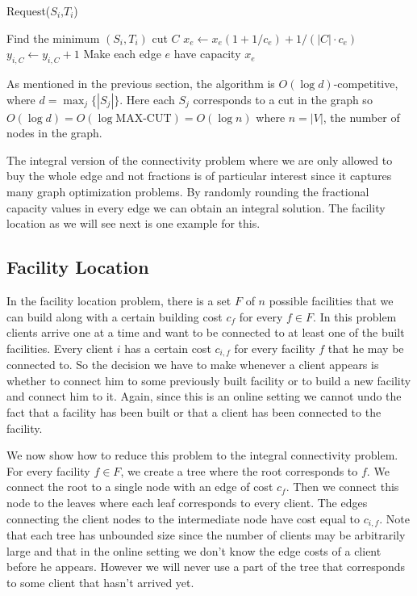 \begin{algorithm}
\caption{Request($S_i$,$T_i$)}
\begin{algorithmic}[1]
  \STATE Find the minimum  $(S_i,T_i)$ cut $C$
    \STATE $x_e \leftarrow x_e (1 + 1/c_e) + 1/(|C| \cdot c_e)$ 
  \ENDFOR
  \STATE $y_{i,C} \leftarrow y_{i,C} + 1$
\ENDWHILE
\STATE Make each edge $e$ have capacity $x_e$
\end{algorithmic}
\end{algorithm}

As mentioned in the previous section, the algorithm is $O(\log d)$-competitive, where $d = \max_j\{|S_j|\}$. Here each $S_j$ corresponds to a cut in the graph so $O( \log d ) = O( \log \textrm{MAX-CUT} ) = O( \log n )$ where $n = |V|$, the number of nodes in the graph.

The integral version of the connectivity problem where we are only allowed to buy the whole edge and not fractions is of particular interest since it captures many graph optimization problems. By randomly rounding the fractional capacity values in every edge we can obtain an integral solution. The facility location as we will see next is one example for this.

\subsection{Facility Location}
In the facility location problem, there is a set $F$ of $n$ possible facilities that we can build along with a certain building cost $c_f$ for every $f \in F$. In this problem clients arrive one at a time and want to be connected to at least one of the built facilities. Every client $i$ has a certain cost $c_{i,f}$ for every facility $f$ that he may be connected to. So the decision we have to make whenever a client appears is whether to connect him to some previously built facility or to build a new facility and connect him to it. Again, since this is an online setting we cannot undo the fact that a facility has been built or that a client has been connected to the facility.

We now show how to reduce this problem to the integral connectivity problem. For every facility $f \in F$, we create a tree where the root corresponds to $f$. We connect the root to a single node with an edge of cost $c_f$. Then we connect this node to the leaves where each leaf corresponds to every client. The edges connecting the client nodes to the intermediate node have cost equal to $c_{i,f}$. Note that each tree has unbounded size since the number of clients may be arbitrarily large and that in the online setting we don't know the edge costs of a client before he appears. However we will never use a part of the tree that corresponds to some client that hasn't arrived yet.

